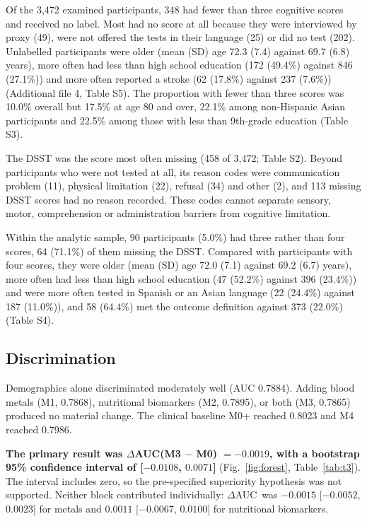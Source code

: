 \documentclass[12pt]{article}
\newcommand{\deltaauc}{$\Delta$AUC}
\begin{document}
Of the 3,472 examined participants, 348 had fewer than three cognitive scores and received no label. Most had no score at all because they were interviewed by proxy (49), were not offered the tests in their language (25) or did no test (202). Unlabelled participants were older (mean (SD) age 72.3 (7.4) against 69.7 (6.8) years), more often had less than high school education (172 (49.4\%) against 846 (27.1\%)) and more often reported a stroke (62 (17.8\%) against 237 (7.6\%)) (Additional file 4, Table S5). The proportion with fewer than three scores was 10.0\% overall but 17.5\% at age 80 and over, 22.1\% among non-Hispanic Asian participants and 22.5\% among those with less than 9th-grade education (Table S3).

The DSST was the score most often missing (458 of 3,472; Table S2). Beyond participants who were not tested at all, its reason codes were communication problem (11), physical limitation (22), refusal (34) and other (2), and 113 missing DSST scores had no reason recorded. These codes cannot separate sensory, motor, comprehension or administration barriers from cognitive limitation.

Within the analytic sample, 90 participants (5.0\%) had three rather than four scores, 64 (71.1\%) of them missing the DSST. Compared with participants with four scores, they were older (mean (SD) age 72.0 (7.1) against 69.2 (6.7) years), more often had less than high school education (47 (52.2\%) against 396 (23.4\%)) and were more often tested in Spanish or an Asian language (22 (24.4\%) against 187 (11.0\%)), and 58 (64.4\%) met the outcome definition against 373 (22.0\%) (Table S4).

\subsection*{Discrimination}

Demographics alone discriminated moderately well (AUC 0.7884). Adding blood metals (M1, 0.7868), nutritional biomarkers (M2, 0.7895), or both (M3, 0.7865) produced no material change. The clinical baseline M0+ reached 0.8023 and M4 reached 0.7986.

\textbf{The primary result was \deltaauc(M3 $-$ M0) $= -0.0019$, with a bootstrap 95\% confidence interval of [$-0.0108$, $0.0071$]} (Fig.~\ref{fig:forest}, Table~\ref{tab:t3}). The interval includes zero, so the pre-specified superiority hypothesis was not supported. Neither block contributed individually: \deltaauc\ was $-0.0015$ [$-0.0052$, $0.0023$] for metals and $0.0011$ [$-0.0067$, $0.0100$] for nutritional biomarkers.
\end{document}
